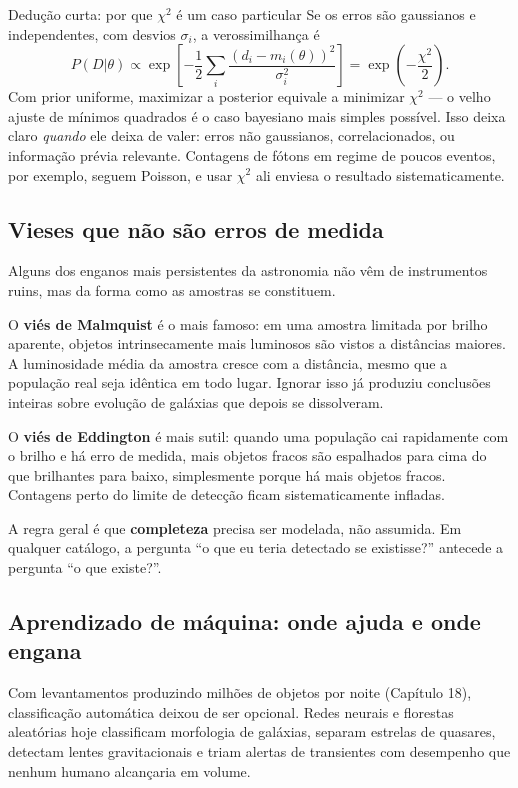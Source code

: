 \documentclass[11pt,a4paper]{article}
\begin{document}
\begin{lessonblock}[borderline west={2pt}{0pt}{astroGold}]{Dedução curta: por que $\chi^2$ é um caso particular}
Se os erros são gaussianos e independentes, com desvios $\sigma_i$, a verossimilhança é
\[
P(D|\theta)\propto\exp\left[-\frac{1}{2}\sum_i\frac{(d_i-m_i(\theta))^{2}}{\sigma_i^{2}}\right]=\exp\left(-\frac{\chi^{2}}{2}\right).
\]
Com prior uniforme, maximizar a posterior equivale a minimizar $\chi^{2}$ --- o velho ajuste de mínimos quadrados é o caso bayesiano mais simples possível. Isso deixa claro \emph{quando} ele deixa de valer: erros não gaussianos, correlacionados, ou informação prévia relevante. Contagens de fótons em regime de poucos eventos, por exemplo, seguem Poisson, e usar $\chi^2$ ali enviesa o resultado sistematicamente.
\end{lessonblock}

\subsection*{Vieses que não são erros de medida}

Alguns dos enganos mais persistentes da astronomia não vêm de instrumentos ruins, mas da forma como as amostras se constituem.

O \textbf{viés de Malmquist} é o mais famoso: em uma amostra limitada por brilho aparente, objetos intrinsecamente mais luminosos são vistos a distâncias maiores. A luminosidade média da amostra cresce com a distância, mesmo que a população real seja idêntica em todo lugar. Ignorar isso já produziu conclusões inteiras sobre evolução de galáxias que depois se dissolveram.

O \textbf{viés de Eddington} é mais sutil: quando uma população cai rapidamente com o brilho e há erro de medida, mais objetos fracos são espalhados para cima do que brilhantes para baixo, simplesmente porque há mais objetos fracos. Contagens perto do limite de detecção ficam sistematicamente infladas.

A regra geral é que \textbf{completeza} precisa ser modelada, não assumida. Em qualquer catálogo, a pergunta ``o que eu teria detectado se existisse?'' antecede a pergunta ``o que existe?''.

\subsection*{Aprendizado de máquina: onde ajuda e onde engana}

Com levantamentos produzindo milhões de objetos por noite (Capítulo 18), classificação automática deixou de ser opcional. Redes neurais e florestas aleatórias hoje classificam morfologia de galáxias, separam estrelas de quasares, detectam lentes gravitacionais e triam alertas de transientes com desempenho que nenhum humano alcançaria em volume.
\end{document}
